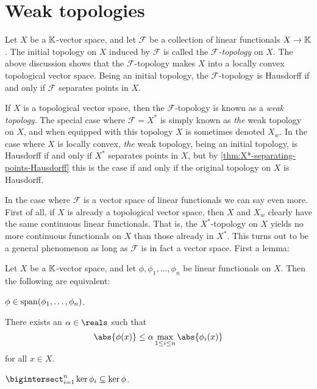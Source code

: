 \documentclass[article, a4paper, 11pt, oneside]{memoir}
\numberwithin{equation}{chapter}
\newcommand{\calF}{\mathcal{F}}
\begin{document}
\section{Weak topologies}

Let $X$ be a $\mathbb{K}$-vector space, and let $\calF$ be a collection of linear functionals $X \to \mathbb{K}$. The initial topology on $X$ induced by $\calF$ is called the \emph{$\calF$-topology} on $X$. The above discussion shows that the $\calF$-topology makes $X$ into a locally convex topological vector space. Being an initial topology, the $\calF$-topology is Hausdorff if and only if $\calF$ separates points in $X$.

If $X$ is a topological vector space, then the $\calF$-topology is known as a \emph{weak topology}. The special case where $\calF = X^*$ is simply known as \emph{the} weak topology on $X$, and when equipped with this topology $X$ is sometimes denoted $X_w$. In the case where $X$ is locally convex, \emph{the} weak topology, being an initial topology, is Hausdorff if and only if $X^*$ separates points in $X$, but by \cref{thm:X*-separating-points-Hausdorff} this is the case if and only if the original topology on $X$ is Hausdorff.

In the case where $\calF$ is a vector space of linear functionals we can say even more. First of all, if $X$ is already a topological vector space, then $X$ and $X_w$ clearly have the same continuous linear functionals. That is, the $X^*$-topology on $X$ yields no more continuous functionals on $X$ than those already in $X^*$. This turns out to be a general phenomenon as long as $\calF$ is in fact a vector space. First a lemma:

\begin{lemma}
    \label{thm:linear-functional-span-lemma}
    Let $X$ be a $\mathbb{K}$-vector space, and let $\phi, \phi_1, \ldots, \phi_n$ be linear functionals on $X$. Then the following are equivalent:
    \begin{enumlem}
        \item \label{enum:linear-functional-span-lemma-span} $\phi \in \operatorname{span}(\phi_1, \ldots, \phi_n)$.
        
        \item \label{enum:linear-functional-span-lemma-bounded} There exists an $\alpha \in \reals$ such that
        \begin{equation*}
            \abs{\phi(x)}
                \leq \alpha \max_{1 \leq i \leq n} \abs{\phi_i(x)}
        \end{equation*}
        for all $x \in X$.

        \item \label{enum:linear-functional-span-lemma-kernel} $\bigintersect_{i=1}^n \ker\phi_i \subseteq \ker\phi$.
    \end{enumlem}
\end{lemma}
\end{document}

